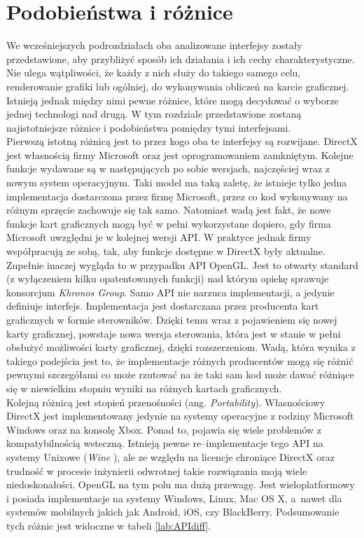 \documentclass[archive]{mgr}
\begin{document}
\section{Podobieństwa i różnice}

We wcześniejszych podrozdziałach oba analizowane interfejsy zostały przedstawione, aby przybliżyć sposób ich działania i ich cechy charakterystyczne. Nie ulega wątpliwości, że każdy z nich służy do takiego samego celu, renderowanie grafiki lub ogólniej, do wykonywania obliczeń na karcie graficznej. Istnieją jednak między nimi pewne różnice, które mogą decydować o wyborze jednej technologi nad drugą. W tym rozdziale przedstawione zostaną najistotniejsze różnice i podobieństwa pomiędzy tymi interfejsami.\\

Pierwszą istotną różnicą jest to przez kogo oba te interfejsy są rozwijane. DirectX jest własnością firmy Microsoft oraz jest oprogramowaniem zamkniętym. Kolejne funkcje wydawane są w następujących po sobie wersjach, najczęściej wraz z nowym system operacyjnym. Taki model ma taką zaletę, że istnieje tylko jedna implementacja dostarczona przez firmę Microsoft, przez co kod wykonywany na różnym sprzęcie zachowuje się tak samo. Natomiast wadą jest fakt, że nowe funkcje kart graficznych mogą być w pełni wykorzystane dopiero, gdy firma Microsoft uwzględni je w kolejnej wersji API. W praktyce jednak firmy współpracują ze sobą, tak, aby funkcje dostępne w DirectX były aktualne. Zupełnie inaczej wygląda to w przypadku API OpenGL. Jest to otwarty standard (z wyłączeniem kilku opatentowanych funkcji) nad którym opiekę sprawuje konsorcjum \emph{Khronos Group}. Samo API nie narzuca implementacji, a jedynie definiuje interfejs. Implementacja jest dostarczana przez producenta kart graficznych w formie sterowników. Dzięki temu wraz z pojawieniem się nowej karty graficznej, powstaje nowa wersja sterowania, która jest w stanie w pełni obsłużyć możliwości karty graficznej, dzięki rozszerzeniom. Wadą, która wynika z takiego podejścia jest to, że implementacje różnych producentów mogą się różnić pewnymi szczegółami co może rzutować na że taki sam kod może dawać różniące się w niewielkim stopniu wyniki na różnych kartach graficznych.\\

Kolejną różnicą jest stopień przenośności (ang. \emph{Portability}). Własnościowy DirectX jest implementowany jedynie na systemy operacyjne z rodziny Microsoft Windows oraz na konsolę Xbox. Ponad to, pojawia się wiele problemów z kompatybilnością wsteczną. Istnieją pewne re–implementacje tego API na systemy Unixowe (\emph{Wine} \cite{wine}), ale ze względu na licencje chroniące DirectX oraz trudność w procesie inżynierii odwrotnej takie rozwiązania moją wiele niedoskonałości. OpenGL na tym polu ma dużą przewagę. Jest wieloplatformowy i posiada implementacje na systemy Windows, Linux, Mac OS X, a~nawet dla systemów mobilnych jakich jak Android, iOS, czy BlackBerry. Podsumowanie tych różnic jest widoczne w tabeli \ref{lab:APIdiff}.\\
\end{document}
